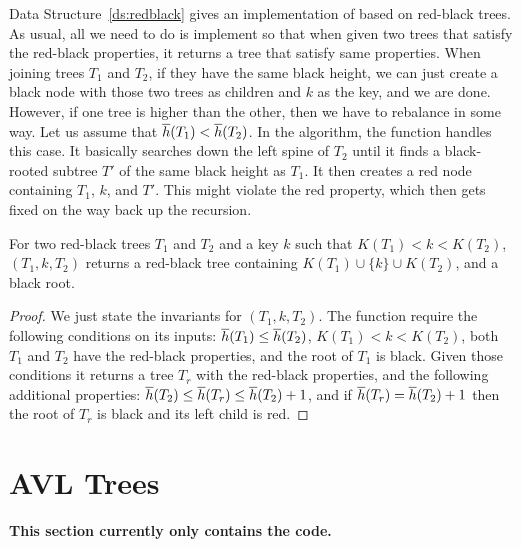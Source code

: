 Data Structure~\ref{ds:redblack} gives an implementation of
 based on red-black trees.  As usual, all we need to
do is implement  so that when given two trees that
satisfy the red-black properties, it returns a tree that satisfy same
properties.    When joining trees $T_1$ and $T_2$, if they have the same
black height, we can just create a black node with those two trees as
children and $k$ as the key, and we are done.  However, if one tree is
higher than the other, then we have to rebalance in some way.  Let us
assume that $\overline{h}(T_1) < \overline{h}(T_2)$.  In the algorithm, the function
 handles this case.  It basically searches down the
left spine of $T_2$ until it finds a black-rooted subtree $T'$ of the
same black height as $T_1$.  It then creates a red node containing
$T_1$, $k$, and $T'$.  This might violate the red property, which then
gets fixed on the way back up the recursion.

\begin{theorem}
For two red-black trees $T_1$ and $T_2$ and a key $k$ such that
$K(T_1) < k < K(T_2)$, $(T_1,k,T_2)$ returns a
red-black tree containing $K(T_1) \cup \{k\} \cup K(T_2)$, and a black
root.
\end{theorem}
\begin{proof}
We just state the invariants for $(T_1,k,T_2)$.  The
function require the following conditions on its inputs: $\overline{h}(T_1)
\leq \overline{h}(T_2)$, $K(T_1) < k < K(T_2)$, both $T_1$ and $T_2$ have the
red-black properties, and the root of $T_1$ is black.  Given those
conditions it returns a tree $T_r$ with the red-black properties, and
the following additional properties: $\overline{h}(T_2) \leq \overline{h}(T_r) \leq
\overline{h}(T_2) + 1$, and if $\overline{h}(T_r) = \overline{h}(T_2) + 1$ then the root of $T_r$
is black and its left child is red.
\end{proof}

\newcommand{\rrr}{\mathbb{R}}
\begin{comment}
datatype $\tttt$ = Empty | Node of ($\tttt$ ** $\kkk$ ** $\tttt$)@\vspace{.1in}@
\end{comment}




\section{AVL Trees}

\textbf{This section currently only contains the code.}

